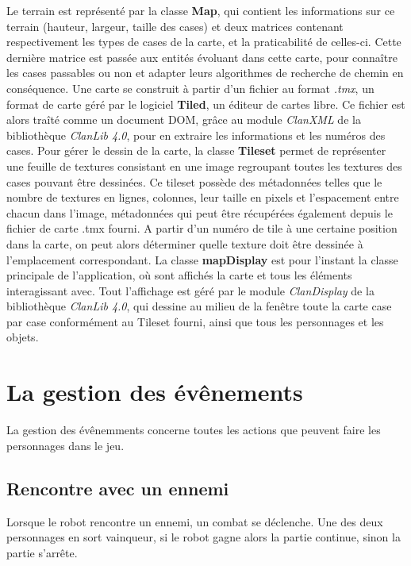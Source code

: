 \documentclass[a4paper 12pts]{article}
\begin{document}
Le terrain est représenté par la classe \textbf{Map}, qui contient les informations sur ce terrain (hauteur, largeur, taille des cases) et deux matrices contenant respectivement les types de cases de la carte, et la praticabilité de celles-ci. Cette dernière matrice est passée aux entités évoluant dans cette carte, pour connaître les cases passables ou non et adapter leurs algorithmes de recherche de chemin en conséquence.
Une carte se construit à partir d'un fichier au format \emph{.tmx}, un format de carte géré par le logiciel \textbf{Tiled}, un éditeur de cartes libre. Ce fichier est alors traîté comme un document DOM, grâce au module \emph{ClanXML} de la bibliothèque \emph{ClanLib 4.0}, pour en extraire les informations et les numéros des cases.
Pour gérer le dessin de la carte, la classe \textbf{Tileset} permet de représenter une feuille de textures consistant en une image regroupant toutes les textures des cases pouvant être dessinées. Ce tileset possède des métadonnées telles que le nombre de textures en lignes, colonnes, leur taille en pixels et l'espacement entre chacun dans l'image, métadonnées qui peut être récupérées également depuis le fichier de carte .tmx fourni. A partir d'un numéro de tile à une certaine position dans la carte, on peut alors déterminer quelle texture doit être dessinée à l'emplacement correspondant. 
La classe \textbf{mapDisplay} est pour l'instant la classe principale de l'application, où sont affichés la carte et tous les éléments interagissant avec. Tout l'affichage est géré par le module \emph{ClanDisplay} de la bibliothèque \emph{ClanLib 4.0}, qui dessine au milieu de la fenêtre toute la carte case par case conformément au Tileset fourni, ainsi que tous les personnages et les objets.

\section{La gestion des évênements}

La gestion des évênemments concerne toutes les actions que peuvent faire les personnages dans le jeu.

\subsection {Rencontre avec un ennemi} 

Lorsque le robot rencontre un ennemi, un combat se déclenche. Une des deux personnages en sort vainqueur, si le robot gagne alors la partie continue, sinon la partie s'arrête.
\end{document}
